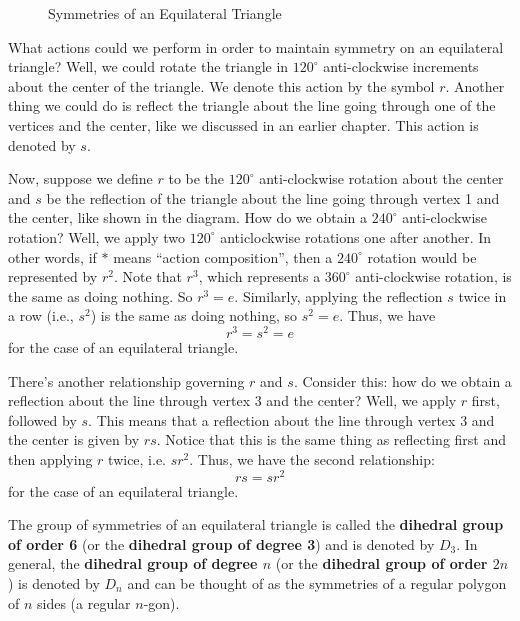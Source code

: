 \begin{figure}[h]
    \centering
    \caption{Symmetries of an Equilateral Triangle}
\end{figure}

What actions could we perform in order to maintain symmetry on an equilateral triangle? Well, we could rotate the triangle in $120^\circ$ anti-clockwise increments about the center of the triangle. We denote this action by the symbol $r$. Another thing we could do is reflect the triangle about the line going through one of the vertices and the center, like we discussed in an earlier chapter. This action is denoted by $s$.

Now, suppose we define $r$ to be the $120^\circ$ anti-clockwise rotation about the center and $s$ be the reflection of the triangle about the line going through vertex 1 and the center, like shown in the diagram. How do we obtain a $240^\circ$ anti-clockwise rotation? Well, we apply two $120^\circ$ anticlockwise rotations one after another. In other words, if $\ast$ means ``action composition'', then a $240^\circ$ rotation would be represented by $r^2$. Note that $r^3$, which represents a $360^\circ$ anti-clockwise rotation, is the same as doing nothing. So $r^3 = e$. Similarly, applying the reflection $s$ twice in a row (i.e., $s^2$) is the same as doing nothing, so $s^2 = e$. Thus, we have
\[
    r^3 = s^2 = e
\]
for the case of an equilateral triangle.

There's another relationship governing $r$ and $s$. Consider this: how do we obtain a reflection about the line through vertex 3 and the center? Well, we apply $r$ first, followed by $s$. This means that a reflection about the line through vertex 3 and the center is given by $rs$. Notice that this is the same thing as reflecting first and then applying $r$ twice, i.e. $sr^2$. Thus, we have the second relationship:
\[
    rs = sr^2
\]
for the case of an equilateral triangle.

The group of symmetries of an equilateral triangle is called the \textbf{dihedral group of order 6} (or the \textbf{dihedral group of degree 3}) and is denoted by $D_3$. In general, the \textbf{dihedral group of degree $n$} (or the \textbf{dihedral group of order $2n$}) is denoted by $D_n$ and can be thought of as the symmetries of a regular polygon of $n$ sides (a regular $n$-gon).

